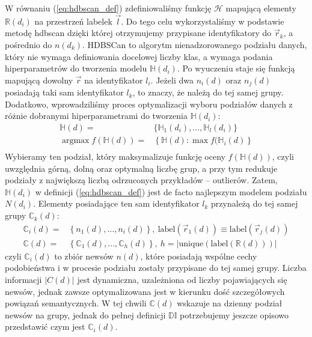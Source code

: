 W równaniu (\ref{eq:hdbscan_def}) zdefiniowaliśmy funkcję $\mathcal{H}$ mapującą elementy $\mathbb{R}(d_{i})$ 
na przestrzeń labelek $\vec{l}$. Do tego celu wykorzystaliśmy w podstawie metodę hdbscan dzięki której 
otrzymujemy przypisane identyfikatory do $\vec{r}_{k}$, a pośrednio do $n(d_{k})$. HDBSCan to algorytm 
nienadzorowanego podziału danych, który nie wymaga definiowania docelowej liczby klas, a wymaga podania 
hiperparametrów do tworzenia modelu $\mathbb{H}(d_{i})$. Po wyuczeniu staje się funkcją mapującą dowolny $\vec{r}$ 
na identyfikator $l_{i}$. Jeżeli dwa $n_{i}(d)$ oraz $n_{j}(d)$ posiadają taki sam identyfikator $l_{k}$, 
to znaczy, że należą do tej samej grupy. Dodatkowo, wprowadziliśmy proces optymalizacji wyboru podziałów 
danych z różnie dobranymi hiperparametrami do tworzenia $\mathbb{H}(d_{i})$:
\begin{equation} \label{eq:hdbscan_mod}
    \begin{aligned}
        \mathbb{H}(d) = & \{ \mathbb{H}_{1}(d_{i}), ..., \mathbb{H}_{l}(d_{i}) \} \\
        \operatorname*{argmax} f(\mathbb{H}(d)) = & \left\{ \mathbb{H}(d): \operatorname*{max}f(\mathbb{H}_{i}(d) \right\} \\
    \end{aligned}
\end{equation}
Wybieramy ten podział, który maksymalizuje funkcję oceny $f(\mathbb{H}(d))$, czyli uwzględnia górną, 
dolną oraz optymalną liczbę grup, a przy tym redukuje podziały z największą liczbą odrzuconych przykładów -- outlierów. 
Zatem, $\mathbb{H}(d_{i})$ w definicji (\ref{eq:hdbscan_def}) jest de facto najlepszym modelem podziału $N(d_{i})$. 
Elementy posiadające ten sam identyfikator $l_{k}$ przynależą do tej samej grupy $\mathbb{C}_{k}(d)$:
\begin{equation} \label{eq:daily_cluster}
    \begin{aligned}
        \mathbb{C}_{i}(d) = & 
            \left\{ n_{1}(d), ..., n_{i}(d)  \right\}, \:  
            \textrm{label}(\vec{r}_{1}(d)) \equiv \textrm{label}(\vec{r}_{j}(d)) \\
        \mathbb{C}(d) = & 
            \left\{ \mathbb{C}_{1}(d), ..., \mathbb{C}_{h}(d) \right\}, \: 
            h = |\mathrm{unique}(\mathrm{label}(\mathbb{R}(d)))|
    \end{aligned}
\end{equation}
czyli $\mathbb{C}_{i}(d)$ to zbiór newsów $n(d)$, które posiadają wspólne cechy podobieństwa i w procesie podziału
zostały przypisane do tej samej grupy. Liczba informacji $|C(d)|$ jest dynamiczna, uzależniona 
od liczby pojawiających się newsów, jednak zawsze optymalizowana jest w kierunku dość szczegółowych powiązań semantycznych. W tej chwili $\mathbb{C}(d)$ wskazuje na dzienny podział newsów na grupy, jednak do pełnej 
definicji $\mathbb{DI}$ potrzebujemy jeszcze opisowo przedstawić czym jest $\mathbb{C}_{i}(d)$. 

